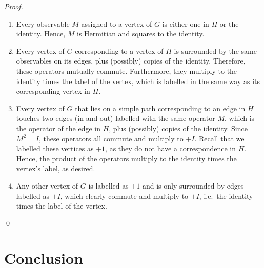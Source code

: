 \documentclass{llncs}
\begin{document}
\begin{proof}
  \begin{enumerate}
  \item Every observable \(M\) assigned to a vertex of \(G\) is either one in \(H\) or
    the identity. Hence, \(M\) is Hermitian and squares to the identity.

  \item Every vertex of \(G\) corresponding to a vertex of \(H\) is
    surrounded by the same observables on its edges, plus (possibly)
    copies of the identity. Therefore, these operators mutually
    commute. Furthermore, they multiply to the identity times the
    label of the vertex, which is labelled in the same way as its
    corresponding vertex in \(H\).

  \item Every vertex of \(G\) that lies on a simple path corresponding
    to an edge in \(H\) touches two edges (in and out) labelled with
    the same operator \(M\), which is the operator of the edge in
    \(H\), plus (possibly) copies of the identity. Since
    \(M^{2} = I\), these operators all commute and multiply to
    \(+I\). Recall that we labelled these vertices as \(+1\), as they
    do not have a correspondence in \(H\). Hence, the product of the
    operators multiply to the identity times the vertex's label, as
    desired.

  \item Any other vertex of \(G\) is labelled as \(+1\) and is only
    surrounded by edges labelled as \(+I\), which clearly commute
    and multiply to \(+I\), i.e.\ the identity times the label of the vertex.
  \end{enumerate}
  \qed
\end{proof}

\section{Conclusion}\label{sec:conc}

\printbibliography{}
\end{document}
